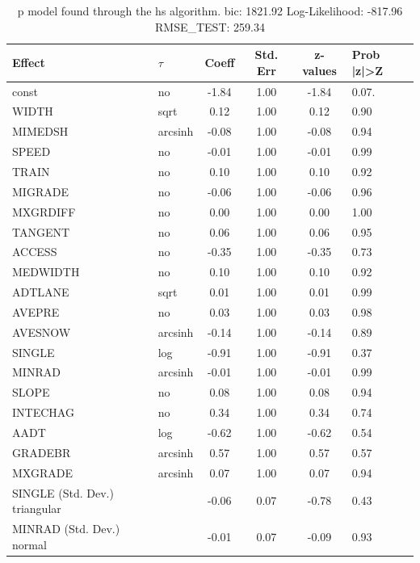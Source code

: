 \begin{table}
	\caption{p model found through the hs algorithm. bic: 1821.92 Log-Likelihood: -817.96 RMSE_TEST: 259.34}
	\begin{center}
		\begin{tabular}{|l|l|c|c|c|l|}
			\hline
			Effect & $\tau$ & Coeff & Std. Err & z-values & Prob |z|>Z \\
			\hline
			const & no & -1.84 & 1.00 & -1.84 & 0.07. \\
			\hline
			WIDTH & sqrt & 0.12 & 1.00 & 0.12 & 0.90 \\
			\hline
			MIMEDSH & arcsinh & -0.08 & 1.00 & -0.08 & 0.94 \\
			\hline
			SPEED & no & -0.01 & 1.00 & -0.01 & 0.99 \\
			\hline
			TRAIN & no & 0.10 & 1.00 & 0.10 & 0.92 \\
			\hline
			MIGRADE & no & -0.06 & 1.00 & -0.06 & 0.96 \\
			\hline
			MXGRDIFF & no & 0.00 & 1.00 & 0.00 & 1.00 \\
			\hline
			TANGENT & no & 0.06 & 1.00 & 0.06 & 0.95 \\
			\hline
			ACCESS & no & -0.35 & 1.00 & -0.35 & 0.73 \\
			\hline
			MEDWIDTH & no & 0.10 & 1.00 & 0.10 & 0.92 \\
			\hline
			ADTLANE & sqrt & 0.01 & 1.00 & 0.01 & 0.99 \\
			\hline
			AVEPRE & no & 0.03 & 1.00 & 0.03 & 0.98 \\
			\hline
			AVESNOW & arcsinh & -0.14 & 1.00 & -0.14 & 0.89 \\
			\hline
			SINGLE & log & -0.91 & 1.00 & -0.91 & 0.37 \\
			\hline
			MINRAD & arcsinh & -0.01 & 1.00 & -0.01 & 0.99 \\
			\hline
			SLOPE & no & 0.08 & 1.00 & 0.08 & 0.94 \\
			\hline
			INTECHAG & no & 0.34 & 1.00 & 0.34 & 0.74 \\
			\hline
			AADT & log & -0.62 & 1.00 & -0.62 & 0.54 \\
			\hline
			GRADEBR & arcsinh & 0.57 & 1.00 & 0.57 & 0.57 \\
			\hline
			MXGRADE & arcsinh & 0.07 & 1.00 & 0.07 & 0.94 \\
			\hline
			SINGLE (Std. Dev.) triangular &  & -0.06 & 0.07 & -0.78 & 0.43 \\
			\hline
			MINRAD (Std. Dev.) normal &  & -0.01 & 0.07 & -0.09 & 0.93 \\

\end{tabular}
\end{center}
\end{table}
